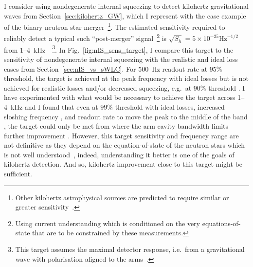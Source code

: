I consider using nondegenerate internal squeezing to detect kilohertz gravitational waves from Section~\ref{sec:kilohertz_GW}, which I represent with the case example of the binary neutron-star merger~\footnote{Other kilohertz astrophysical sources are predicted to require similar or greater sensitivity~\cite{}.}. The estimated sensitivity required to reliably detect a typical such ``post-merger'' signal~\footnote{Using current understanding which is conditioned on the very equations-of-state that are to be constrained by these measurements.} is $\sqrt{S_h}=5\times10^{-25} \mathrm{Hz}^{-1/2}$ from 1--4~kHz~\cite{miaoDesignGravitationalWaveDetectors2018}~\footnote{This target assumes the maximal detector response, i.e.\ from a gravitational wave with polarisation aligned to the arms~\cite{}.}.
In Fig.~\ref{fig:nIS_sens_target}, I compare this target to the sensitivity of nondegenerate internal squeezing with the realistic and ideal loss cases from Section~\ref{sec:nIS_vs_sWLC}. 
For 500~Hz readout rate at $95\%$ threshold, the target is achieved at the peak frequency  with ideal losses but is not achieved for realistic losses  and/or decreased squeezing, e.g.\ at $90\%$ threshold . I have experimented with what would be necessary to achieve the target across 1--4~kHz and I found that even at $99\%$ threshold with ideal losses, increased sloshing frequency , and readout rate to move the peak to the middle of the band , the target could only be met from  where the arm cavity bandwidth limits further improvement . 
However, this target sensitivity and frequency range are not definitive as they depend on the equation-of-state of the neutron stars which is not well understood~\cite{}, indeed, understanding it better is one of the goals of kilohertz detection. And so, kilohertz improvement close to this target might be sufficient.
